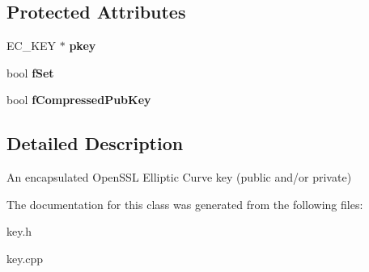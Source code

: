 \subsection*{Protected Attributes}
\begin{DoxyCompactItemize}
\item 
\mbox{\label{class_c_key_aa00648b28abd6d8b1532abc4ae18942a}} 
E\+C\+\_\+\+K\+EY $\ast$ {\bfseries pkey}
\item 
\mbox{\label{class_c_key_a7129f82d574d193f5da394df91bd15fb}} 
bool {\bfseries f\+Set}
\item 
\mbox{\label{class_c_key_a9eb79b4a2375d58ac54d9a208a3e9be6}} 
bool {\bfseries f\+Compressed\+Pub\+Key}
\end{DoxyCompactItemize}


\subsection{Detailed Description}
An encapsulated Open\+S\+SL Elliptic Curve key (public and/or private) 

The documentation for this class was generated from the following files\+:\begin{DoxyCompactItemize}
\item 
key.\+h\item 
key.\+cpp\end{DoxyCompactItemize}
